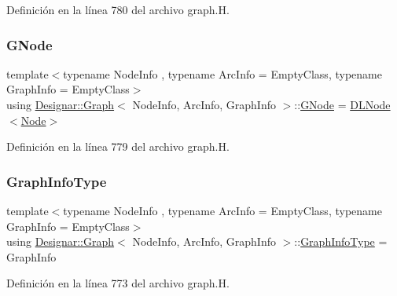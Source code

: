 Definición en la línea 780 del archivo graph.\+H.

\mbox{\label{class_designar_1_1_graph_a7e61951db0bb9bfa8a2e317440d4e17f}} 
\subsubsection{\texorpdfstring{G\+Node}{GNode}}
{\footnotesize\ttfamily template$<$typename Node\+Info , typename Arc\+Info  = Empty\+Class, typename Graph\+Info  = Empty\+Class$>$ \\
using \hyperlink{class_designar_1_1_graph}{Designar\+::\+Graph}$<$ Node\+Info, Arc\+Info, Graph\+Info $>$\+::\hyperlink{class_designar_1_1_graph_a7e61951db0bb9bfa8a2e317440d4e17f}{G\+Node} =  \hyperlink{class_designar_1_1_d_l_node}{D\+L\+Node}$<$\hyperlink{class_designar_1_1_graph_a5dfc7dba9d092ac489c72e40390c37d0}{Node}$>$\hspace{0.3cm}{\ttfamily [protected]}}



Definición en la línea 779 del archivo graph.\+H.

\mbox{\label{class_designar_1_1_graph_a5b6ad505f3b0f5a5cd288a13bebf2d27}} 
\subsubsection{\texorpdfstring{Graph\+Info\+Type}{GraphInfoType}}
{\footnotesize\ttfamily template$<$typename Node\+Info , typename Arc\+Info  = Empty\+Class, typename Graph\+Info  = Empty\+Class$>$ \\
using \hyperlink{class_designar_1_1_graph}{Designar\+::\+Graph}$<$ Node\+Info, Arc\+Info, Graph\+Info $>$\+::\hyperlink{class_designar_1_1_graph_a5b6ad505f3b0f5a5cd288a13bebf2d27}{Graph\+Info\+Type} =  Graph\+Info}



Definición en la línea 773 del archivo graph.\+H.

\mbox{\label{class_designar_1_1_graph_a5dfc7dba9d092ac489c72e40390c37d0}} 
